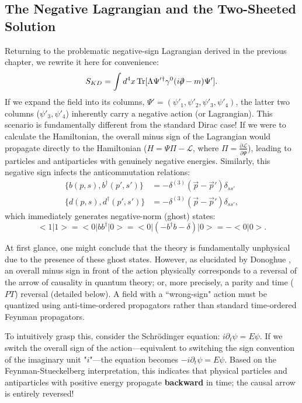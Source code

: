 \subsection{The Negative Lagrangian and the Two-Sheeted Solution}

Returning to the problematic negative-sign Lagrangian derived in the previous chapter, we rewrite it here for convenience: 
\begin{equation}
  \label{eq:S_KD_Lorentzian1p}
  S_{KD}=\int d^{4}x\,{\rm Tr}[\Lambda\Psi'{}^{\dagger}\gamma^{0}(i\partial\!\!\!\!\;\!/-m)\Psi'].
\end{equation}
If we expand the field into its columns, $\Psi'=(\psi'_1, \psi'_2, \psi'_3, \psi'_4)$, the latter two columns ($\psi'_3, \psi'_4$) inherently carry a negative action (or Lagrangian). This scenario is fundamentally different from the standard Dirac case! If we were to calculate the Hamiltonian, the overall minus sign of the Lagrangian would propagate directly to the Hamiltonian ($H=\Psi\Pi-\mathcal{L}$, where $\Pi=\frac{\partial \mathcal{L}}{\partial \dot\Psi}$), leading to particles and antiparticles with genuinely negative energies. Similarly, this negative sign infects the anticommutation relations: 
\begin{equation}
\begin{aligned}
    \{b(p,s),b^\dagger(p',s')\}&=-\delta^{(3)}(\vec{p}-\vec{p}')\delta_{ss'}\\
    \{d(p,s),d^\dagger(p',s')\}&=-\delta^{(3)}(\vec{p}-\vec{p}')\delta_{ss'},
\end{aligned}
\end{equation}
which immediately generates negative-norm (ghost) states:
\[ \big<1|1\big>=\big<0|bb^\dagger|0\big>=\big<0|(-b^\dagger b-\delta)|0\big>=-\big<0|0\big>.\]

At first glance, one might conclude that the theory is fundamentally unphysical due to the presence of these ghost states. However, as elucidated by Donoghue \cite{Donoghue:2019ecz}, an overall minus sign in front of the action physically corresponds to a reversal of the arrow of causality in quantum theory; or, more precisely, a parity and time ($PT$) reversal (detailed below). A field with a ``wrong-sign" action must be quantized using anti-time-ordered propagators rather than standard time-ordered Feynman propagators. 

To intuitively grasp this, consider the Schrödinger equation: $i\partial_t \psi=E\psi$. If we switch the overall sign of the action—equivalent to switching the sign convention of the imaginary unit "$i$"—the equation becomes $-i\partial_t \psi=E\psi$. Based on the Feynman-Stueckelberg interpretation, this indicates that physical particles and antiparticles with positive energy propagate \textbf{backward} in time; the causal arrow is entirely reversed!

